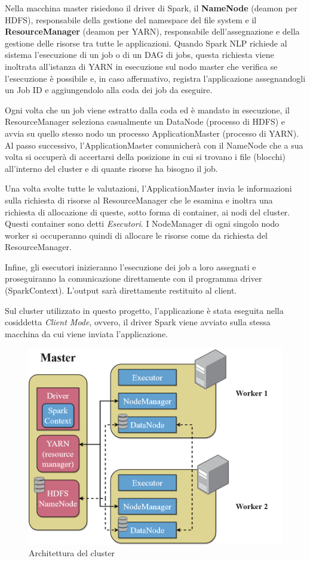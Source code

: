 Nella macchina master risiedono il driver di Spark, il \textbf{NameNode} (deamon per HDFS), responsabile della gestione del namespace del file system e il \textbf{ResourceManager} (deamon per YARN), responsabile dell’assegnazione e della gestione delle risorse tra tutte le applicazioni. Quando Spark NLP richiede al sistema l'esecuzione di un job o di un DAG di jobs, questa richiesta viene inoltrata all'istanza di YARN in esecuzione sul nodo master che verifica se l'esecuzione è possibile e, in caso affermativo, registra l'applicazione assegnandogli un Job ID e aggiungendolo alla coda dei job da eseguire. 

Ogni volta che un job viene estratto dalla coda ed è mandato in esecuzione, il ResourceManager seleziona casualmente un DataNode (processo di HDFS) e avvia su quello stesso nodo un processo ApplicationMaster (processo di YARN). Al passo successivo, l'ApplicationMaster comunicherà con il NameNode che a sua volta si occuperà di accertarsi della posizione in cui si trovano i file (blocchi) all'interno del cluster e di quante risorse ha bisogno il job. 

Una volta svolte tutte le valutazioni, l'ApplicationMaster invia le informazioni sulla richiesta di risorse al ResourceManager che le esamina e inoltra una richiesta di allocazione di queste, sotto forma di container, ai nodi del cluster. Questi container sono detti \textit{Esecutori}. I NodeManager di ogni singolo nodo worker si occuperanno quindi di allocare le risorse come da richiesta del ResourceManager. 

Infine, gli esecutori inizieranno l'esecuzione dei job a loro assegnati e proseguiranno la comunicazione direttamente con il programma driver (SparkContext). L'output sarà direttamente restituito al client.

Sul cluster utilizzato in questo progetto, l'applicazione è stata eseguita nella cosiddetta \textit{Client Mode}, ovvero, il driver Spark viene avviato sulla stessa macchina da cui viene inviata l'applicazione.

\begin{figure}[hbt!]
    \centering
    \includegraphics[width=1\textwidth]{img/architecture/cluster_architecture2.png}
    \caption{Architettura del cluster}
    \label{fig:cluster_architecture}
\end{figure}

